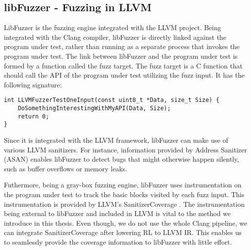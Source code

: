 \subsection{libFuzzer - Fuzzing in LLVM}
LibFuzzer \cite{LibFuzzer} is the fuzzing engine integrated with the LLVM project.
Being integrated with the Clang compiler, libFuzzer is directly linked against the program under test, rather than running as a separate process that invokes the program under test.
The link between libFuzzer and the program under test is formed by a function called the fuzz target.
The fuzz target is a C function that should call the API of the program under test utilizing the fuzz input. 
It has the following signature:

\begin{lstlisting}  
int LLVMFuzzerTestOneInput(const uint8_t *Data, size_t Size) {
    DoSomethingInterestingWithMyAPI(Data, Size);
    return 0;
}
\end{lstlisting}

Since it is integrated with the LLVM framework, libFuzzer can make use of various LLVM sanitizers.
For instance, information provided by Address Sanitizer (ASAN) \cite{ASAN} enables libFuzzer to detect bugs that might otherwise happen silently, such as buffer overflows or memory leaks.

Futhermore, being a gray-box fuzzing engine, libFuzzer uses instrumentation on the program under test to track the basic blocks visited by each fuzz input.
This instrumentation is provided by LLVM's SanitizerCoverage \cite{SanCov}.
The instrumentation being external to libFuzzer and included in LLVM is vital to the method we introduce in this thesis.
Even though, we do not use the whole Clang pipeline, we can integrate SanitizerCoverage after lowering RL to LLVM IR.
This enables us to seamlessly provide the coverage information to libFuzzer with little effort.